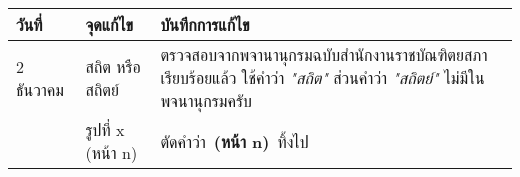 % 
\begin{table}[ht!]
    \center
    \begin{tabularx}{\textwidth}{|l|l|X|}
        \hline
        \rowcolor{LightGray}
        {\bf วันที่}   & {\bf จุดแก้ไข}          & {\bf บันทึกการแก้ไข} \\ \hline
        2 ธันวาคม    & สถิต หรือ สถิตย์          & ตรวจสอบจากพจานานุกรมฉบับสำนักงานราชบัณฑิตยสภาเรียบร้อยแล้ว %
                                              ใช้คำว่า {\it "สถิต"} ส่วนคำว่า {\it "สถิตย์"} ไม่มีในพจนานุกรมครับ \\ \hline
                    & รูปที่ x (หน้า n)         & ตัดคำว่า\ {\bf (หน้า n)}\ ทิ้งไป \\ \hline
    \end{tabularx}
\end{table}

